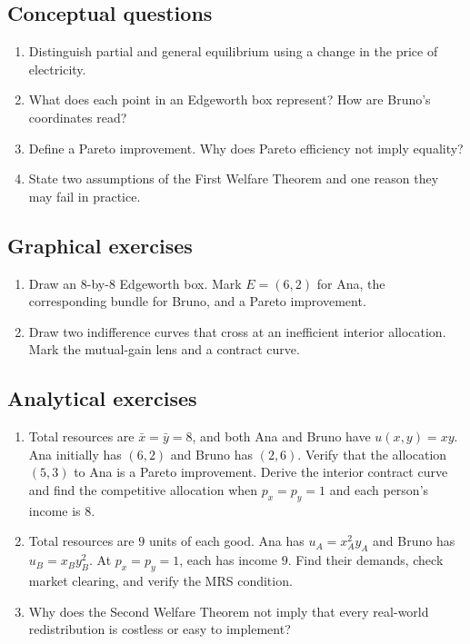 \subsection*{Conceptual questions}
\begin{enumerate}[label=\arabic*.]
  \item Distinguish partial and general equilibrium using a change in the price of electricity.
  \item What does each point in an Edgeworth box represent? How are Bruno's coordinates read?
  \item Define a Pareto improvement. Why does Pareto efficiency not imply equality?
  \item State two assumptions of the First Welfare Theorem and one reason they may fail in practice.
\end{enumerate}

\subsection*{Graphical exercises}
\begin{enumerate}[resume,label=\arabic*.]
  \item Draw an $8$-by-$8$ Edgeworth box. Mark $E=(6,2)$ for Ana, the corresponding bundle for Bruno, and a Pareto improvement.
  \item Draw two indifference curves that cross at an inefficient interior allocation. Mark the mutual-gain lens and a contract curve.
\end{enumerate}

\subsection*{Analytical exercises}
\begin{enumerate}[resume,label=\arabic*.]
  \item Total resources are $\bar{x}=\bar{y}=8$, and both Ana and Bruno have $u(x,y)=xy$. Ana initially has $(6,2)$ and Bruno has $(2,6)$. Verify that the allocation $(5,3)$ to Ana is a Pareto improvement. Derive the interior contract curve and find the competitive allocation when $p_x=p_y=1$ and each person's income is $8$.
  \item Total resources are $9$ units of each good. Ana has $u_A=x_A^2y_A$ and Bruno has $u_B=x_By_B^2$. At $p_x=p_y=1$, each has income $9$. Find their demands, check market clearing, and verify the MRS condition.
  \item Why does the Second Welfare Theorem not imply that every real-world redistribution is costless or easy to implement?
\end{enumerate}

